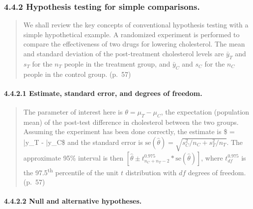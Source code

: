 \documentclass[
]{article}
\begin{document}
\hypertarget{hypothesis-testing-for-simple-comparisons.}{%
\subsubsection{4.4.2 Hypothesis testing for simple
comparisons.}\label{hypothesis-testing-for-simple-comparisons.}}

\begin{quote}
We shall review the key concepts of conventional hypothesis testing with
a simple hypothetical example. A randomized experiment is performed to
compare the effectiveness of two drugs for lowering cholesterol. The
mean and standard deviation of the post-treatment cholesterol levels are
\(\bar y_T\) and \(s_T\) for the \(n_T\) people in the treatment group,
and \(\bar y_C\) and \(s_C\) for the \(n_C\) people in the control
group. (p.~57)
\end{quote}

\hypertarget{estimate-standard-error-and-degrees-of-freedom.}{%
\paragraph{4.4.2.1 Estimate, standard error, and degrees of
freedom.}\label{estimate-standard-error-and-degrees-of-freedom.}}

\begin{quote}
The parameter of interest here is \(\theta = \mu_T - \mu_C\), the
expectation (population mean) of the post-test difference in cholesterol
between the two groups. Assuming the experiment has been done correctly,
the estimate is \$ \hat \theta= \bar y\_T - \bar y\_C\$ and the standard
error is \(\text{se} (\hat \theta) = \sqrt{s_C^2 / n_C + s_T^2 / n_T}\).
The approximate 95\% interval is then
\([\hat \theta \pm t_{n_C + n_T - 2}^{0.975} * \text{se} (\hat \theta)]\),
where \(t_{df}^{0.975}\) is the 97.5\textsuperscript{th} percentile of
the unit \(t\) distribution with \(df\) degrees of freedom. (p.~57)
\end{quote}

\hypertarget{null-and-alternative-hypotheses.}{%
\paragraph{4.4.2.2 Null and alternative
hypotheses.}\label{null-and-alternative-hypotheses.}}
\end{document}

